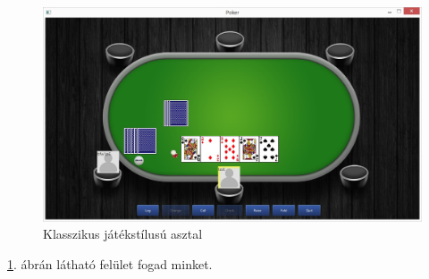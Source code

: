 \begin{figure}[h!]
  \caption{Klasszikus játékstílusú asztal}
  \label{fig:classic_table}
  \centering
    \includegraphics[width=\textwidth]{user-documentation/images/classic_game.jpg}
\end{figure}
\ref{fig:classic_table}. ábrán látható felület fogad minket.

\clearpage
